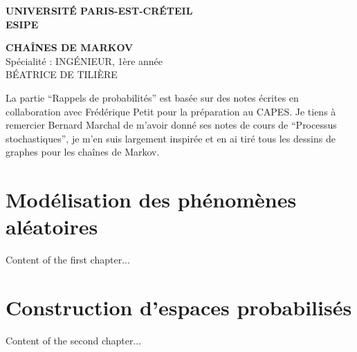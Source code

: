 \documentclass[pdflatex,sn-mathphys-num]{sn-jnl}
\begin{document}
\vfill

\begin{titlepage}
    \begin{center}
    \begin{tcolorbox}[colframe=black, colback=white, width=\textwidth, boxrule=0.5mm, halign=center, valign=center]
        \textbf{\Large \uppercase{Université Paris-Est-Créteil}} \\[0.4cm]
        \textbf{\Large ESIPE}
    \end{tcolorbox}  %
    \vspace{4cm} %
    \textbf{\LARGE CHAÎNES DE MARKOV} \\[1.5cm]
    \large Spécialité : INGÉNIEUR, 1ère année \\[2cm]
    \large \uppercase{Béatrice de Tilière} \\[2cm]
\end{center}


    \vfill

    \noindent La partie “Rappels de probabilités” est basée sur des notes écrites en collaboration avec Frédérique Petit pour la préparation au CAPES. Je tiens à remercier Bernard Marchal de m’avoir donné ses notes de cours de “Processus stochastiques”, je m’en suis largement inspirée et en ai tiré tous les dessins de graphes pour les chaînes de Markov.

    \vfill
\end{titlepage}

\newpage
\tableofcontents
\thispagestyle{plain} %
\newpage

\section{Modélisation des phénomènes aléatoires}
\thispagestyle{plain} %
Content of the first chapter...

\section{Construction d’espaces probabilisés}
\thispagestyle{plain} %
 Content of the second chapter...
\end{document}
